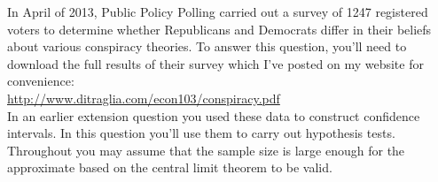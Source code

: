 \documentclass[addpoints,12pt]{exam}\usepackage[]{graphicx}\usepackage[]{color}
\makeatletter
\newcommand{\hlnum}[1]{\textcolor[rgb]{0.686,0.059,0.569}{#1}}%
\newcommand{\hlopt}[1]{\textcolor[rgb]{0,0,0}{#1}}%
\newcommand{\hlstd}[1]{\textcolor[rgb]{0.345,0.345,0.345}{#1}}%
\newcommand{\hlkwb}[1]{\textcolor[rgb]{0.69,0.353,0.396}{#1}}%
\newcommand{\hlkwd}[1]{\textcolor[rgb]{0.737,0.353,0.396}{\textbf{#1}}}%
\newenvironment{kframe}{%
 \def\at@end@of@kframe{}%
 \ifinner\ifhmode%
  \def\at@end@of@kframe{\end{minipage}}%
  \begin{minipage}{\columnwidth}%
 \fi\fi%
 \def\FrameCommand##1{\hskip\@totalleftmargin \hskip-\fboxsep
 \colorbox{shadecolor}{##1}\hskip-\fboxsep
     \hskip-\linewidth \hskip-\@totalleftmargin \hskip\columnwidth}%
 \MakeFramed {\advance\hsize-\width
   \@totalleftmargin\z@ \linewidth\hsize
   \@setminipage}}%
 {\par\unskip\endMakeFramed%
 \at@end@of@kframe}
\newenvironment{knitrout}{}{} %
\makeatother
\begin{document}
\begin{questions}

\question In April of 2013, Public Policy Polling carried out a survey of 1247 registered voters to determine whether Republicans and Democrats differ in their beliefs about various conspiracy theories. To answer this question, you'll need to download the full results of their survey which I've posted on my website for convenience:\\
\url{http://www.ditraglia.com/econ103/conspiracy.pdf}\\
In an earlier extension question you used these data to construct confidence intervals. In this question you'll use them to carry out hypothesis tests. Throughout you may assume that the sample size is large enough for the approximate based on the central limit theorem to be valid.
\end{questions}
\end{document}
